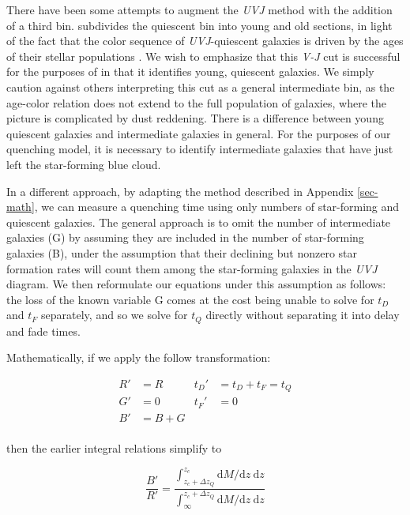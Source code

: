 There have been some attempts to augment the \textit{UVJ} method with the addition of a third bin.
\citet{Whitaker:2012aa} subdivides the quiescent bin into young and old sections, in light of the fact that the color sequence of \textit{UVJ}-quiescent galaxies is driven by the ages of their stellar populations \citep{Whitaker:2010aa,Whitaker:2012aa}.
We wish to emphasize that this \textit{V-J} cut is successful for the purposes of \citet{Whitaker:2010aa,Whitaker:2012aa} in that it identifies young, quiescent galaxies.
We simply caution against others interpreting this cut as a general intermediate bin, as the age-color relation does not extend to the full population of galaxies, where the picture is complicated by dust reddening.
There is a difference between young quiescent galaxies and intermediate galaxies in general.
For the purposes of our quenching model, it is necessary to identify intermediate galaxies that have just left the star-forming blue cloud.

In a different approach, by adapting the method described in Appendix \ref{sec-math}, we can measure a quenching time using only numbers of star-forming and quiescent galaxies.
The general approach is to omit the number of intermediate galaxies (G) by assuming they are included in the number of star-forming galaxies (B), under the assumption that their declining but nonzero star formation rates will count them among the star-forming galaxies in the \textit{UVJ} diagram.
We then reformulate our equations under this assumption as follows:
the loss of the known variable G comes at the cost being unable to solve for $t_D$ and $t_F$ separately, and so we solve for $t_Q$ directly without separating it into delay and fade times.

Mathematically, if we apply the follow transformation:

\begin{equation*}
\begin{aligned}
R'&=R    & t_D'&=t_D+t_F=t_Q\\
G'&=0    & t_F'&=0\\
B'&=B+G & \\
\end{aligned}
\end{equation*}

then the earlier integral relations simplify to

\begin{equation*}
\frac{B'}{R'} = \frac{\displaystyle\int_{z_c + \Delta z_Q}^{z_c} \mathrm{d}M/\mathrm{d}z\ \mathrm{d}z}{\displaystyle\int_{\infty}^{z_c + \Delta z_Q} \mathrm{d}M/\mathrm{d}z\ \mathrm{d}z}
\end{equation*}

